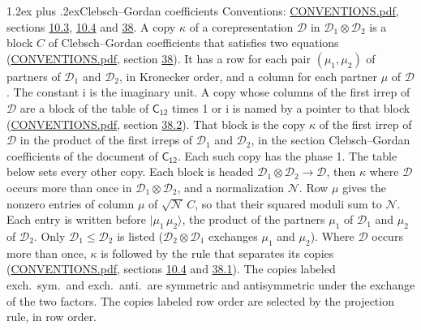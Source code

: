\documentclass[10pt,a4paper]{article}
\makeatletter
\renewcommand\section{\@startsection{section}{1}{\z@}{-3ex plus -1ex minus -.2ex}%
  {1.2ex plus .2ex}{\normalfont\large\sffamily\bfseries\color{parttitle}}}
\numberwithin{equation}{section}
\newcommand{\grp}[1]{\mathsf{#1}}
\newcommand{\iunit}{\mathrm{i}}
\newcommand{\irrprod}{\otimes}
\newcommand{\mult}{\kappa}
\newcommand{\intx}{\mu}
\newcommand{\cgnorm}{\mathcal{N}}
\newcommand{\prodket}[2]{\lvert {#1}\,{#2}\rangle}
\makeatother
\begin{document}
\section{Clebsch--Gordan coefficients}\label{s:clebsch_gordan}
Conventions: \href{../../CONVENTIONS.pdf}{CONVENTIONS.pdf}, sections \href{../../../rotation/CONVENTIONS.pdf\#conv.10.3}{10.3}, \href{../../../rotation/CONVENTIONS.pdf\#conv.10.4}{10.4} and \href{../../CONVENTIONS.pdf\#conv.38}{38}.
\leavevmode\label{n:index.copy}\label{n:matrix.cg.stored}A copy $\mult$ of a corepresentation $\mathcal{D}$ in $\mathcal{D}_1\irrprod\mathcal{D}_2$ is a block $C$ of Clebsch--Gordan coefficients that satisfies two equations (\href{../../CONVENTIONS.pdf}{CONVENTIONS.pdf}, section \href{../../CONVENTIONS.pdf\#conv.38}{38}). \label{n:index.cg}It has a row for each pair $(\intx_1, \intx_2)$ of partners of $\mathcal{D}_1$ and $\mathcal{D}_2$, in Kronecker order, and a column for each partner $\intx$ of $\mathcal{D}$.
The constant $\iunit$ is the imaginary unit.
A copy whose columns of the first irrep of $\mathcal{D}$ are a block of the table of $\grp{C_{12}}$ times 1 or $\iunit$ is named by a pointer to that block (\href{../../CONVENTIONS.pdf}{CONVENTIONS.pdf}, section \href{../../CONVENTIONS.pdf\#conv.38.2}{38.2}). That block is the copy $\mult$ of the first irrep of $\mathcal{D}$ in the product of the first irreps of $\mathcal{D}_1$ and $\mathcal{D}_2$, in the section Clebsch--Gordan coefficients of the document of \href{../../../rotation/data/pdf/C12.pdf}{$\grp{C_{12}}$}. Each such copy has the phase 1. The table below sets every other copy.
Each block is headed $\mathcal{D}_1\irrprod\mathcal{D}_2\to\mathcal{D}$, then $\mult$ where $\mathcal{D}$ occurs more than once in $\mathcal{D}_1\irrprod\mathcal{D}_2$, and a normalization $\cgnorm$. Row $\intx$ gives the nonzero entries of column $\intx$ of $\sqrt{\cgnorm}\,C$, so that their squared moduli sum to $\cgnorm$. \label{n:vector.ket.product}Each entry is written before $\prodket{\intx_1}{\intx_2}$, the product of the partners $\intx_1$ of $\mathcal{D}_1$ and $\intx_2$ of $\mathcal{D}_2$. Only $\mathcal{D}_1 \le \mathcal{D}_2$ is listed ($\mathcal{D}_2\irrprod\mathcal{D}_1$ exchanges $\intx_1$ and $\intx_2$).
Where $\mathcal{D}$ occurs more than once, $\mult$ is followed by the rule that separates its copies (\href{../../CONVENTIONS.pdf}{CONVENTIONS.pdf}, sections \href{../../../rotation/CONVENTIONS.pdf\#conv.10.4}{10.4} and \href{../../CONVENTIONS.pdf\#conv.38.1}{38.1}). \label{n:abbreviation.exchange}The copies labeled exch.\ sym.\ and exch.\ anti.\ are symmetric and antisymmetric under the exchange of the two factors. The copies labeled row order are selected by the projection rule, in row order.
\end{document}
